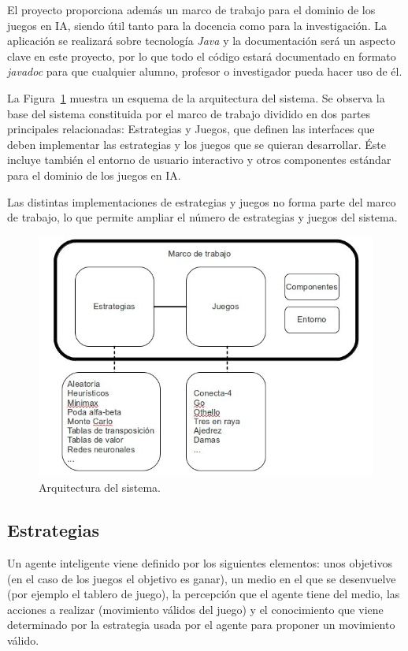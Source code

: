 \documentclass[a4paper,12pt]{article}
\begin{document}
\par 
El proyecto proporciona además un marco de trabajo para el dominio de los juegos en IA, siendo útil tanto para la docencia como para la investigación.
La aplicación se realizará sobre tecnología \textit{Java} y la documentación será un aspecto clave en este proyecto, por lo que todo el código estará documentado en formato \textit{javadoc} para que cualquier alumno, profesor o investigador pueda hacer uso de él.

\par 
La Figura~\ref{fig:sistema} muestra un esquema de la arquitectura del sistema.
Se observa la base del sistema constituida por el marco de trabajo dividido en dos partes principales relacionadas: Estrategias y Juegos, que definen las interfaces que deben implementar las estrategias y los juegos que se quieran desarrollar.
Éste incluye también el entorno de usuario interactivo y otros componentes estándar para el dominio de los juegos en IA.

\par 
Las distintas implementaciones de estrategias y juegos no forma parte del marco de trabajo, lo que permite ampliar el número de estrategias y juegos del sistema.

\begin{figure}[H]
\begin{center}
\includegraphics[scale=0.45]{sistema.jpg}
\caption{Arquitectura del sistema.}
\label{fig:sistema}
\end{center}
\end{figure}


\subsection{Estrategias}
\par 
Un agente inteligente viene definido por los siguientes elementos: unos objetivos (en el caso de los juegos el objetivo es ganar), un medio en el que se desenvuelve (por ejemplo el tablero de juego), la percepción que el agente tiene del medio, las acciones a realizar (movimiento válidos del juego) y el conocimiento que viene determinado por la estrategia usada por el agente para proponer un movimiento válido.
\end{document}
